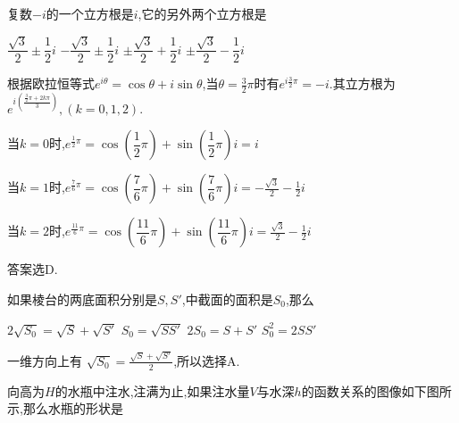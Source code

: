 \begin{questions}
	\question 复数$-i$的一个立方根是$i$,它的另外两个立方根是 \hfs

	\begin{oneparchoices}
		\choice $\dfrac{\sqrt{3}}{2} \pm \dfrac12i$
		\choice $-\dfrac{\sqrt{3}}{2} \pm \dfrac12i$
		\choice $\pm\dfrac{\sqrt{3}}{2} + \dfrac12i$
		\CorrectChoice $\pm\dfrac{\sqrt{3}}{2} - \dfrac12i$
	\end{oneparchoices}

	\begin{solution}
		根据欧拉恒等式$e^{i\theta} = \cos\theta + i\sin\theta$,当$\theta=\frac32\pi$时有$e^{i\frac32\pi} =
			-i$.其立方根为$e^{i(\frac{\frac32\pi + 2k\pi}{3})}, (k=0,1,2)$.

		\begin{cenum}
			\item 当$k=0$时,$e^{\frac12\pi} = \cos \left( \dfrac12\pi \right) + \sin \left( \dfrac12\pi \right)i = i$
			\item 当$k=1$时,$e^{\frac76\pi} = \cos \left( \dfrac76\pi \right) + \sin \left( \dfrac76\pi \right)i =
				      -\frac{\sqrt{3}}{2} - \frac12i$
			\item 当$k=2$时,$e^{\frac{11}6\pi} = \cos \left( \dfrac{11}6\pi \right) + \sin \left( \dfrac{11}6\pi \right)i =
				      \frac{\sqrt{3}}{2} - \frac12i$
		\end{cenum}
		答案选D.
	\end{solution}

	\question 如果棱台的两底面积分别是$S,S'$,中截面的面积是$S_0$,那么 \hfs

	\begin{oneparchoices}
		\CorrectChoice $2\sqrt{S_0} = \sqrt{S} + \sqrt{S'}$
		\choice $S_0 = \sqrt{SS'}$
		\choice $2S_0 = S + S'$
		\choice $S_0^2 = 2SS'$
	\end{oneparchoices}

	\begin{solution}
		一维方向上有 $\sqrt{S_0} = \frac{\sqrt{S} + \sqrt{S'}}{2}$,所以选择A.
	\end{solution}

	\question 向高为$H$的水瓶中注水,注满为止,如果注水量$V$与水深$h$的函数关系的图像如下图所示,那么水瓶的形状是 \hfs

	\begin{center}
	\end{center}


\end{questions}
